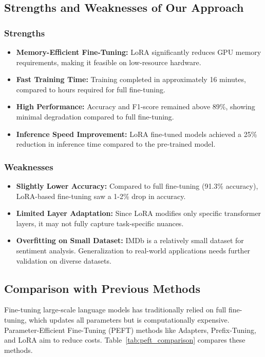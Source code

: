 \documentclass{article} %
\begin{document}
\begin{flushleft}
\subsection{Strengths and Weaknesses of Our Approach}

\subsubsection{Strengths}
\begin{itemize}
    \item \textbf{Memory-Efficient Fine-Tuning:} LoRA significantly reduces GPU memory requirements, making it feasible on low-resource hardware.
    \item \textbf{Fast Training Time:} Training completed in approximately 16 minutes, compared to hours required for full fine-tuning.
    \item \textbf{High Performance:} Accuracy and F1-score remained above 89\%, showing minimal degradation compared to full fine-tuning.
    \item \textbf{Inference Speed Improvement:} LoRA fine-tuned models achieved a 25\% reduction in inference time compared to the pre-trained model.
\end{itemize}

\subsubsection{Weaknesses}
\begin{itemize}
    \item \textbf{Slightly Lower Accuracy:} Compared to full fine-tuning (91.3\% accuracy), LoRA-based fine-tuning saw a 1-2\% drop in accuracy.
    \item \textbf{Limited Layer Adaptation:} Since LoRA modifies only specific transformer layers, it may not fully capture task-specific nuances.
    \item \textbf{Overfitting on Small Dataset:} IMDb is a relatively small dataset for sentiment analysis. Generalization to real-world applications needs further validation on diverse datasets.
\end{itemize}

\subsection{Comparison with Previous Methods}
Fine-tuning large-scale language models has traditionally relied on full fine-tuning, which updates all parameters but is computationally expensive. Parameter-Efficient Fine-Tuning (PEFT) methods like Adapters, Prefix-Tuning, and LoRA aim to reduce costs. Table~\ref{tab:peft_comparison} compares these methods.


\end{flushleft}
\end{document}
